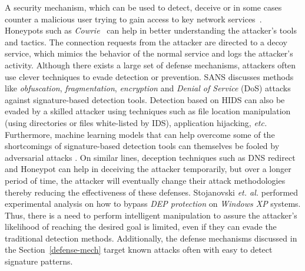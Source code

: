 A security mechanism, which can be used to detect, deceive or in some cases counter a malicious user trying to gain access to key network services~. Honeypots such as \emph{Cowrie}~ can help in better understanding the attacker's tools and tactics. The connection requests from the attacker are directed to a decoy service, which mimics the behavior of the normal service and logs the attacker's activity. 
Although there exists a large set of defense mechanisms, attackers often use clever techniques to evade detection or prevention. SANS  discusses methods like \emph{obfuscation}, \emph{fragmentation}, \emph{encryption} and \emph{Denial of Service} (DoS) attacks against signature-based detection tools.
Detection based on HIDS can also be evaded by a skilled attacker using techniques such as file location manipulation (using directories or files white-listed by IDS), application hijacking, {\em etc.} Furthermore, machine learning models that can help overcome some of the shortcomings of signature-based detection tools can themselves be fooled by adversarial attacks . On similar lines, deception techniques such as DNS redirect and Honeypot can help in deceiving the attacker temporarily, but over a longer period of time, the attacker will eventually change their attack methodologies thereby reducing the effectiveness of these defenses. Stojanovski \textit{et. al.}  performed experimental analysis on how to bypass \emph{DEP protection} on \emph{Windows XP} systems.
Thus, there is a need to perform intelligent manipulation to assure the attacker's likelihood of reaching the desired goal is limited, even if they can evade the traditional detection methods. Additionally, the defense mechanisms discussed in the Section~\ref{defense-mech} target known attacks often with easy to detect signature patterns.

